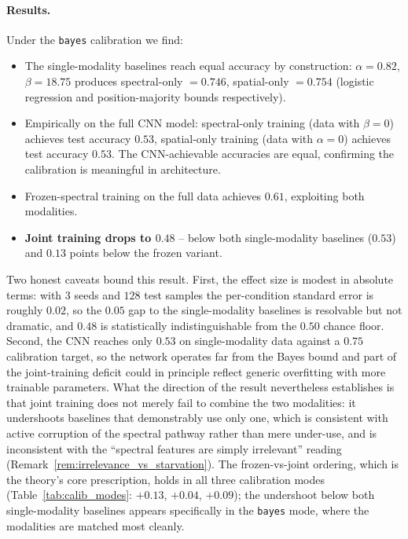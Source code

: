 \paragraph{Results.}
Under the \texttt{bayes} calibration we find:
\begin{itemize}
    \item The single-modality baselines reach equal accuracy by
          construction: $\alpha = 0.82$, $\beta = 18.75$ produces
          spectral-only $= 0.746$, spatial-only $= 0.754$ (logistic
          regression and position-majority bounds respectively).
    \item Empirically on the full CNN model: spectral-only training
          (data with $\beta = 0$) achieves test accuracy $0.53$,
          spatial-only training (data with $\alpha = 0$) achieves
          test accuracy $0.53$. The CNN-achievable accuracies are
          equal, confirming the calibration is meaningful in
          architecture.
    \item Frozen-spectral training on the full data achieves
          $0.61$, exploiting both modalities.
    \item \textbf{Joint training drops to $0.48$} -- below both
          single-modality baselines ($0.53$) and $0.13$ points below
          the frozen variant.
\end{itemize}
Two honest caveats bound this result. First, the effect size is
modest in absolute terms: with $3$ seeds and $128$ test samples the
per-condition standard error is roughly $0.02$, so the $0.05$ gap to
the single-modality baselines is resolvable but not dramatic, and
$0.48$ is statistically indistinguishable from the $0.50$ chance
floor. Second, the CNN reaches only $0.53$ on single-modality data
against a $0.75$ calibration target, so the network operates far from
the Bayes bound and part of the joint-training deficit could in
principle reflect generic overfitting with more trainable parameters.
What the direction of the result nevertheless establishes is that
joint training does not merely fail to combine the two modalities: it
undershoots baselines that demonstrably use only one, which is
consistent with active corruption of the spectral pathway rather than
mere under-use, and is inconsistent with the ``spectral features are
simply irrelevant'' reading
(Remark~\ref{rem:irrelevance_vs_starvation}). The frozen-vs-joint
ordering, which is the theory's core prescription, holds in all three
calibration modes (Table~\ref{tab:calib_modes}: $+0.13$, $+0.04$,
$+0.09$); the undershoot below both single-modality baselines appears
specifically in the \texttt{bayes} mode, where the modalities are
matched most cleanly.

